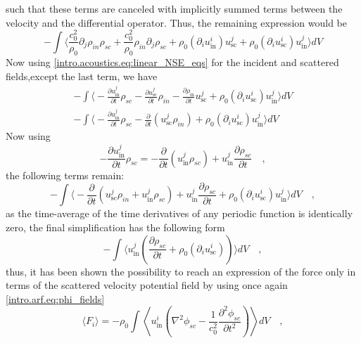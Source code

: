 such that these terms are canceled with implicitly summed terms between the velocity and the differential operator. Thus, the remaining expression would be
\begin{equation}
    -\int\bigg\langle\frac{c_0^2}{\rho_0}\partial_j\rho_{in}\rho_{sc} + \frac{c_0^2}{\rho_0}\rho_{in}\partial_j\rho_{sc} + \rho_0(\partial_{i}u_{\text{in}}^{i})u_{\text{sc}}^{j} + \rho_0(\partial_{i}u_{\text{sc}}^{i})u_{\text{in}}^{j}\bigg\rangle dV
\end{equation}
Now using \eqref{intro.acoustics.eq:linear_NSE_eqs} for the incident and scattered fields,except the last term, we have
\begin{align}
    -\int\bigg\langle-\frac{\partial u_{\text{in}}^{j}}{\partial t}\rho_{sc} - \frac{\partial u_{\text{sc}}^{j}}{\partial t}\rho_{in} -\frac{\partial\rho_{\text{in}}}{\partial t}u_{\text{sc}}^{j} + \rho_0(\partial_{i}u_{\text{sc}}^{i})u_{\text{in}}^{j}\bigg\rangle dV \nonumber\\
    -\int\bigg\langle-\frac{\partial u_{\text{in}}^{j}}{\partial t}\rho_{sc} - \frac{\partial}{\partial t}(u_{\text{sc}}^{j}\rho_{in}) + \rho_0(\partial_{i}u_{\text{sc}}^{i})u_{\text{in}}^{j}\bigg\rangle dV 
\end{align}
Now using 
\begin{equation}
    -\frac{\partial u_{\text{in}}^{j}}{\partial t}\rho_{sc} = -\frac{\partial}{\partial t}(u_{\text{in}}^{j}\rho_{sc}) + u_{\text{in}}^{j}\frac{\partial \rho_{sc}}{\partial t}\quad,
\end{equation}
the following terms remain:
\begin{equation}
    -\int\bigg\langle-\frac{\partial}{\partial t}(u_{\text{sc}}^{j}\rho_{in} + u_{\text{in}}^{j}\rho_{sc}) + u_{\text{in}}^{j}\frac{\partial \rho_{sc}}{\partial t} + \rho_0(\partial_{i}u_{\text{sc}}^{i})u_{\text{in}}^{j}\bigg\rangle dV\quad,
\end{equation}
as the time-average of the time derivatives of any periodic function is identically zero, the final simplification has the following form
\begin{equation}
    -\int\bigg\langle u_{\text{in}}^{j}\left(\frac{\partial \rho_{sc}}{\partial t} + \rho_0(\partial_{i}u_{\text{sc}}^{i})\right)\bigg\rangle dV\quad,
\end{equation}
thus, it has been shown the possibility to reach an expression of the force only in terms of the scattered velocity potential field by using once again \eqref{intro.arf.eq:phi_fields}
\begin{equation}\label{intro.arf.eq:F_sc}
    \langle F_{i} \rangle = - \rho_0\int \left\langle u_{\text{in}}^i\left(\nabla^2\phi_{sc}-\frac{1}{c_0^2}\frac{\partial^2\phi_{sc}}{\partial  t^2}\right)\right\rangle dV\quad,
\end{equation}

